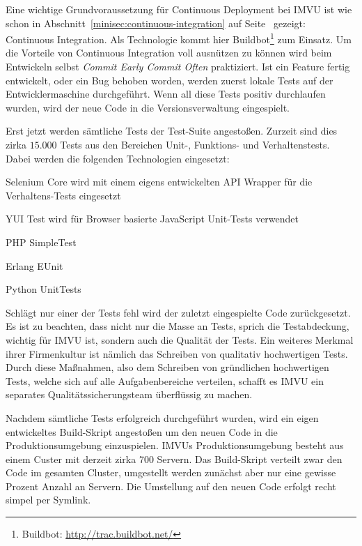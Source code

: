 Eine wichtige Grundvoraussetzung für Continuous Deployment
bei IMVU ist wie schon in Abschnitt~\ref{minisec:continuous-integration} auf
Seite~\pageref{minisec:continuous-integration} gezeigt: Continuous
Integration. Als Technologie kommt hier Buildbot\footnote{Buildbot:
\url{http://trac.buildbot.net/}} zum Einsatz. Um die Vorteile von Continuous
Integration voll ausnützen zu können wird beim Entwickeln selbst \emph{Commit
Early Commit Often} praktiziert. Ist ein Feature fertig entwickelt, oder ein
Bug behoben worden, werden zuerst lokale Tests auf der Entwicklermaschine
durchgeführt. Wenn all diese Tests positiv durchlaufen wurden, wird der neue
Code in die Versionsverwaltung eingespielt.

Erst jetzt werden sämtliche Tests der Test-Suite angestoßen. Zurzeit sind
dies zirka $15.000$ Tests aus den Bereichen Unit-, Funktions- und
Verhaltenstests. Dabei werden die folgenden Technologien eingesetzt:

\begin{itemize*}
    \item Selenium Core wird mit einem eigens entwickelten API Wrapper für
          die Verhaltens-Tests eingesetzt
    \item YUI Test wird für Browser basierte JavaScript Unit-Tests verwendet
    \item PHP SimpleTest
    \item Erlang EUnit
    \item Python UnitTests
\end{itemize*}

Schlägt nur einer der Tests fehl wird der zuletzt eingespielte Code
zurückgesetzt. Es ist zu beachten, dass nicht nur die Masse an Tests, sprich
die Testabdeckung, wichtig für IMVU ist, sondern auch die Qualität der Tests.
Ein weiteres Merkmal ihrer Firmenkultur ist nämlich das Schreiben von
qualitativ hochwertigen Tests. Durch diese Maßnahmen, also dem Schreiben von
gründlichen hochwertigen Tests, welche sich auf alle Aufgabenbereiche
verteilen, schafft es IMVU ein separates Qualitätssicherungsteam überflüssig
zu machen.

Nachdem sämtliche Tests erfolgreich durchgeführt wurden, wird ein eigen
entwickeltes Build-Skript angestoßen um den neuen Code in die
Produktionsumgebung einzuspielen. IMVUs Produktionsumgebung besteht aus einem
Custer mit derzeit zirka 700 Servern. Das Build-Skript verteilt zwar den Code
im gesamten Cluster, umgestellt werden zunächst aber nur eine gewisse Prozent
Anzahl an Servern. Die Umstellung auf den neuen Code erfolgt recht simpel per
Symlink. 

